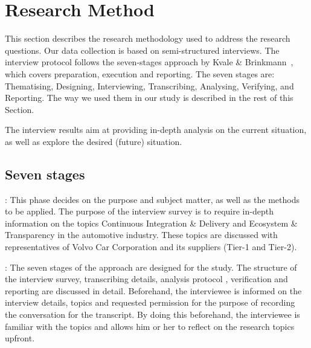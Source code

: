 \section{Research Method}\label{sec:researchMethod}

This section describes the research methodology used to address the research questions.
Our data collection is based on semi-structured interviews. 
The interview protocol follows the seven-stages approach by Kvale \& Brinkmann~\cite{Kvale2015Interviews}, which covers preparation, execution and reporting. The seven stages are: Thematising, Designing, Interviewing, Transcribing, Analysing, Verifying, and Reporting. The way we used them in our study is described in the rest of this Section. 

The interview results aim at providing in-depth analysis on the current situation, as well as explore the desired (future) situation. %

\subsection{Seven stages}

: This phase decides on the purpose and subject matter, as well as the methods to be applied. The purpose of the interview survey is to require in-depth information on the topics Continuous Integration \& Delivery and Ecosystem \& Transparency in the automotive industry. These topics are discussed with representatives of Volvo Car Corporation and its suppliers (Tier-1 and Tier-2). %

: The seven stages of the approach are designed for the study. The structure of the interview survey, transcribing details, analysis protocol \cite{saldana2015coding}, verification and reporting are discussed in detail. Beforehand, the interviewee is informed on the interview details, topics and requested permission for the purpose of recording the conversation for the transcript. By doing this beforehand, the interviewee is familiar with the topics and allows him or her to reflect on the research topics upfront.

